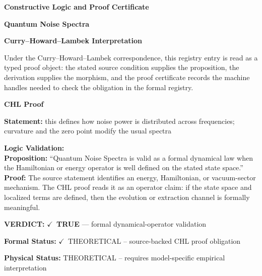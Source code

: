 \clearpage
\begingroup\tzpsupportsetup
\noindent\textbf{\fontsize{10.8pt}{12.8pt}\selectfont [ID 0062] Constructive Logic and Proof Certificate}\par
\noindent\textbf{\fontsize{10pt}{12pt}\selectfont Quantum Noise Spectra}\par
\vspace{0.45em}
\begingroup
\footnotesize
\setlength{\parskip}{0.22em}
\setlength{\parindent}{0pt}
\noindent\textbf{Curry--Howard--Lambek Interpretation}\par
Under the Curry--Howard--Lambek correspondence, this registry entry is read as a typed proof
object: the stated source condition supplies the proposition, the derivation supplies the
morphism, and the proof certificate records the machine handles needed to check the obligation
in the formal registry.

\vspace{0.45em}
\noindent\textbf{CHL Proof}\par
\textbf{Statement:} this defines how noise power is distributed across frequencies; curvature and the zero
point modify the usual spectra

\textbf{Logic Validation:}\\
\textbf{Proposition:} ``Quantum Noise Spectra is valid as a formal dynamical law when the Hamiltonian or energy
operator is well defined on the stated state space.''\\
\textbf{Proof:} The source statement identifies an energy, Hamiltonian, or vacuum-sector mechanism. The
CHL proof reads it as an operator claim: if the state space and localized terms are
defined, then the evolution or extraction channel is formally meaningful.

\textbf{VERDICT:} \ensuremath{\checkmark}\ \textbf{TRUE} --- formal dynamical-operator validation

\textbf{Formal Status:} \ensuremath{\checkmark}\ THEORETICAL -- source-backed CHL proof obligation

\textbf{Physical Status:} THEORETICAL -- requires model-specific empirical interpretation
\par\vspace{0.45em}
\par
\ifTZPDarkEdition
{}
\fi
\endgroup
\endgroup
